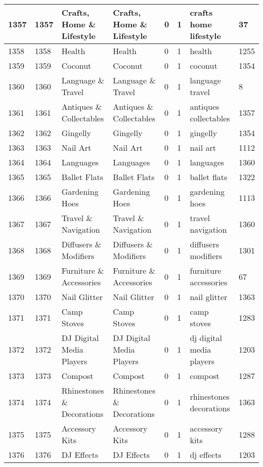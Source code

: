 \begin{longtable}{|l|l|l|l|l|l|l|l|}
1357 & 1357 & Crafts, Home \& Lifestyle & Crafts, Home \& Lifestyle & 0 & 1 & crafts home lifestyle & 37 \\ \hline 
1358 & 1358 & Health & Health & 0 & 1 & health & 1255 \\ \hline 
1359 & 1359 & Coconut & Coconut & 0 & 1 & coconut & 1354 \\ \hline 
1360 & 1360 & Language \& Travel & Language \& Travel & 0 & 1 & language travel & 8 \\ \hline 
1361 & 1361 & Antiques \& Collectables & Antiques \& Collectables & 0 & 1 & antiques collectables & 1357 \\ \hline 
1362 & 1362 & Gingelly & Gingelly & 0 & 1 & gingelly & 1354 \\ \hline 
1363 & 1363 & Nail Art & Nail Art & 0 & 1 & nail art & 1112 \\ \hline 
1364 & 1364 & Languages & Languages & 0 & 1 & languages & 1360 \\ \hline 
1365 & 1365 & Ballet Flats & Ballet Flats & 0 & 1 & ballet flats & 1322 \\ \hline 
1366 & 1366 & Gardening Hoes & Gardening Hoes & 0 & 1 & gardening hoes & 1113 \\ \hline 
1367 & 1367 & Travel \& Navigation & Travel \& Navigation & 0 & 1 & travel navigation & 1360 \\ \hline 
1368 & 1368 & Diffusers \& Modifiers & Diffusers \& Modifiers & 0 & 1 & diffusers modifiers & 1301 \\ \hline 
1369 & 1369 & Furniture \& Accessories & Furniture \& Accessories & 0 & 1 & furniture accessories & 67 \\ \hline 
1370 & 1370 & Nail Glitter & Nail Glitter & 0 & 1 & nail glitter & 1363 \\ \hline 
1371 & 1371 & Camp Stoves & Camp Stoves & 0 & 1 & camp stoves & 1283 \\ \hline 
1372 & 1372 & DJ Digital Media Players & DJ Digital Media Players & 0 & 1 & dj digital media players & 1203 \\ \hline 
1373 & 1373 & Compost & Compost & 0 & 1 & compost & 1287 \\ \hline 
1374 & 1374 & Rhinestones \& Decorations & Rhinestones \& Decorations & 0 & 1 & rhinestones decorations & 1363 \\ \hline 
1375 & 1375 & Accessory Kits & Accessory Kits & 0 & 1 & accessory kits & 1288 \\ \hline 
1376 & 1376 & DJ Effects & DJ Effects & 0 & 1 & dj effects & 1203 \\ \hline 

\end{longtable}
